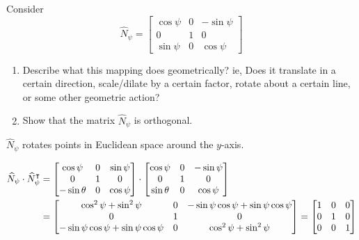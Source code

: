 \documentclass[newpage,hints,handout]{ximera}
\begin{document}
\begin{problem}
  Consider
  \[
  \hat{N}_\psi=\begin{bmatrix}
  \cos\psi & 0 & -\sin\psi\\
  0 & 1 & 0\\
  \sin\psi & 0 & \cos\psi
  \end{bmatrix}
  \]
  \begin{enumerate}
 \item Describe what this mapping does geometrically? ie, Does it translate in a certain direction, scale/dilate by a certain factor, rotate about a certain line, or some other geometric action?
 \item Show that the matrix $\hat{N}_\psi$ is orthogonal.
\end{enumerate}

  
  
\begin{freeResponse}
$\hat{N}_\psi$ rotates points in Euclidean space around the $y$-axis.
\end{freeResponse}

%
%

\begin{freeResponse}
\begin{align*}
\widehat{N}_\psi \cdot \widehat{N}_\psi^\intercal
&= \begin{bmatrix}
	\cos\psi & 0 & \sin\psi \\
	0 & 1 & 0 \\
	-\sin\theta & 0 & \cos\psi 
	\end{bmatrix} \cdot
	\begin{bmatrix}
	\cos\psi & 0 & -\sin\psi \\
	0 & 1 & 0 \\
	\sin\theta & 0 & \cos\psi 
	\end{bmatrix}  \\
	&= \begin{bmatrix}
	\cos^{2}\psi + \sin^{2} \psi & 0 & -\sin\psi \cos\psi + \sin\psi \cos\psi \\
	0 &  1 & 0 \\
	 -\sin\psi \cos\psi + \sin\psi \cos\psi & 0 & \cos^{2}\psi + \sin^{2} \psi 
	\end{bmatrix}
	=  \begin{bmatrix}
	1 & 0 & 0 \\
	0 & 1  & 0 \\
	0 & 0 & 1
	\end{bmatrix}
\end{align*}
\end{freeResponse}
\end{problem}
\end{document}
